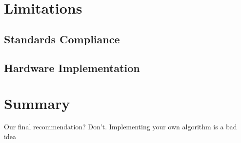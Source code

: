 \section{Limitations}

\subsection{Standards Compliance}

\subsection{Hardware Implementation}

\section{Summary}

Our final recommendation? Don't. Implementing your own algorithm is a bad idea